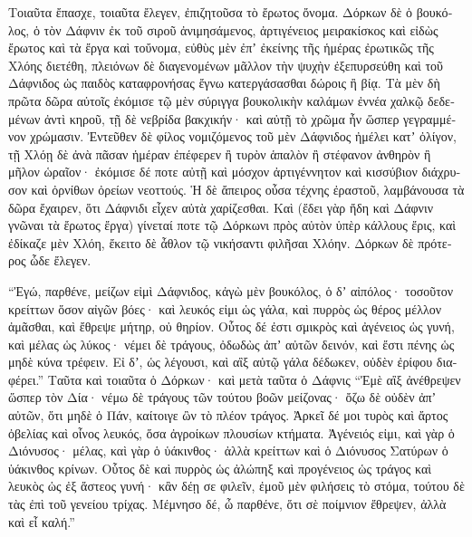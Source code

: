 \documentclass{book}
\begin{document}
\begin{pairs}
\begin{Leftside}
\begin{greek}
  Τοιαῦτα ἔπασχε, τοιαῦτα ἔλεγεν, ἐπιζητοῦσα τὸ ἔρωτος ὄνομα. Δόρκων δὲ ὁ βουκόλος, ὁ τὸν Δάφνιν ἐκ τοῦ σιροῦ ἀνιμησάμενος, ἀρτιγένειος μειρακίσκος καὶ εἰδὼς ἔρωτος καὶ τὰ ἔργα καὶ τοὔνομα, εὐθὺς μὲν ἐπʼ ἐκείνης τῆς ἡμέρας ἐρωτικῶς τῆς Χλόης διετέθη, πλειόνων δὲ διαγενομένων μᾶλλον τὴν ψυχὴν ἐξεπυρσεύθη καὶ τοῦ Δάφνιδος ὡς παιδὸς καταφρονήσας ἔγνω κατεργάσασθαι δώροις ἢ βίᾳ.  Τὰ μὲν δὴ πρῶτα δῶρα αὐτοῖς ἐκόμισε τῷ μὲν σύριγγα βουκολικὴν καλάμων ἐννέα χαλκῷ δεδεμένων ἀντὶ κηροῦ, τῇ δὲ νεβρίδα βακχικήν· καὶ αὐτῇ τὸ χρῶμα ἦν ὥσπερ γεγραμμένον χρώμασιν.  Ἐντεῦθεν δὲ φίλος νομιζόμενος τοῦ μὲν Δάφνιδος ἠμέλει κατʼ ὀλίγον, τῇ Χλόῃ δὲ ἀνὰ πᾶσαν ἡμέραν ἐπέφερεν ἢ τυρὸν ἁπαλὸν ἢ στέφανον ἀνθηρὸν ἢ μῆλον ὡραῖον· ἐκόμισε δέ ποτε αὐτῇ καὶ μόσχον ἀρτιγέννητον καὶ κισσύβιον διάχρυσον καὶ ὀρνίθων ὀρείων νεοττούς. Ἡ δὲ ἄπειρος οὖσα τέχνης ἐραστοῦ, λαμβάνουσα τὰ δῶρα ἔχαιρεν, ὅτι Δάφνιδι εἶχεν αὐτὰ χαρίζεσθαι.  Καὶ (ἔδει γὰρ ἤδη καὶ Δάφνιν γνῶναι τὰ ἔρωτος ἔργα) γίνεταί ποτε τῷ Δόρκωνι πρὸς αὐτὸν ὑπὲρ κάλλους ἔρις, καὶ ἐδίκαζε μὲν Χλόη, ἔκειτο δὲ ἆθλον τῷ νικήσαντι φιλῆσαι Χλόην. Δόρκων δὲ πρότερος ὧδε ἔλεγεν.
\pend


  “Ἐγώ, παρθένε, μείζων εἰμὶ Δάφνιδος, κἀγὼ μὲν βουκόλος, ὁ δʼ αἰπόλος· τοσοῦτον κρείττων ὅσον αἰγῶν βόες· καὶ λευκός εἰμι ὡς γάλα, καὶ πυρρὸς ὡς θέρος μέλλον ἀμᾶσθαι, καὶ ἔθρεψε μήτηρ,  οὐ θηρίον. Οὗτος δέ ἐστι σμικρὸς καὶ ἀγένειος ὡς γυνή, καὶ μέλας ὡς λύκος· νέμει δὲ τράγους, ὀδωδὼς ἀπʼ αὐτῶν δεινόν, καὶ ἔστι πένης ὡς μηδὲ κύνα τρέφειν. Εἰ δʼ, ὡς λέγουσι, καὶ αἲξ αὐτῷ γάλα δέδωκεν, οὐδὲν ἐρίφου διαφέρει.”  Ταῦτα καὶ τοιαῦτα ὁ Δόρκων· καὶ μετὰ ταῦτα ὁ Δάφνις “Ἐμὲ αἲξ ἀνέθρεψεν ὥσπερ τὸν Δία· νέμω δὲ τράγους τῶν τούτου βοῶν μείζονας· ὄζω δὲ οὐδὲν ἀπʼ αὐτῶν, ὅτι μηδὲ ὁ Πάν, καίτοιγε ὢν τὸ πλέον τράγος.  Ἀρκεῖ δέ μοι τυρὸς καὶ ἄρτος ὀβελίας καὶ οἶνος λευκός, ὅσα ἀγροίκων πλουσίων κτήματα. Ἀγένειός εἰμι, καὶ γὰρ ὁ Διόνυσος· μέλας, καὶ γὰρ ὁ ὑάκινθος· ἀλλὰ κρείττων καὶ ὁ Διόνυσος Σατύρων ὁ ὑάκινθος κρίνων.  Οὗτος δὲ καὶ πυρρὸς ὡς ἀλώπηξ καὶ προγένειος ὡς τράγος καὶ λευκὸς ὡς ἐξ ἄστεος γυνή· κἂν δέῃ σε φιλεῖν, ἐμοῦ μὲν φιλήσεις τὸ στόμα, τούτου δὲ τὰς ἐπὶ τοῦ γενείου τρίχας. Μέμνησο δέ, ὦ παρθένε, ὅτι σὲ ποίμνιον ἔθρεψεν, ἀλλὰ καὶ εἶ καλή.”
\pend



\end{greek}
\end{Leftside}
\end{pairs}
\end{document}
